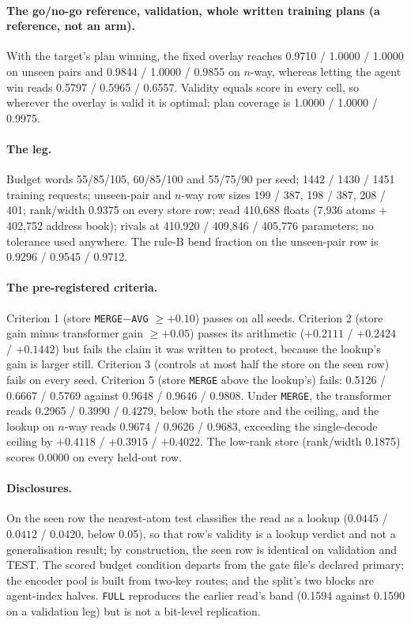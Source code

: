 \documentclass{article} %
\begin{document}
\paragraph{The go/no-go reference, validation, whole written training plans (a reference, not an
arm).} With the target's plan winning, the fixed overlay reaches 0.9710 / 1.0000 / 1.0000 on unseen
pairs and 0.9844 / 1.0000 / 0.9855 on $n$-way, whereas letting the agent win reads 0.5797 / 0.5965 /
0.6557. Validity equals score in every cell, so wherever the overlay is valid it is optimal; plan
coverage is 1.0000 / 1.0000 / 0.9975. %

\paragraph{The leg.} Budget words 55/85/105, 60/85/100 and 55/75/90 per seed; 1442 / 1430 / 1451
training requests; unseen-pair and $n$-way row sizes 199 / 387, 198 / 387, 208 / 401; rank/width
0.9375 on every store row; read 410,688 floats (7,936 atoms + 402,752 address book); rivals at
410,920 / 409,846 / 405,776 parameters; no tolerance used anywhere. The rule-B bend fraction on the
unseen-pair row is 0.9296 / 0.9545 / 0.9712. %

\paragraph{The pre-registered criteria.} Criterion 1 (store \texttt{MERGE}$-$\texttt{AVG} $\ge+0.10$) passes on all seeds.
Criterion 2 (store gain minus transformer gain $\ge+0.05$) passes its arithmetic ($+0.2111$ / $+0.2424$
/ $+0.1442$) but fails the claim it was written to protect, because the lookup's gain is larger
still. Criterion 3 (controls at most half the store on the seen row) fails on every seed. Criterion 5 (store
\texttt{MERGE} above the lookup's) fails: 0.5126 / 0.6667 / 0.5769 against 0.9648 / 0.9646 /
0.9808. Under \texttt{MERGE}, the transformer reads 0.2965 / 0.3990 / 0.4279, below both the store
and the ceiling, and the lookup on $n$-way reads 0.9674 / 0.9626 / 0.9683, exceeding the
single-decode ceiling by $+0.4118$ / $+0.3915$ / $+0.4022$. The low-rank store
(rank/width 0.1875) scores 0.0000 on every held-out row. %

\paragraph{Disclosures.} On the seen row the nearest-atom test classifies the read as a lookup
($0.0445$ / $0.0412$ / $0.0420$, below 0.05), so that row's validity is a lookup verdict and not a
generalisation result; by construction, the seen row is identical on validation and TEST. The
scored budget condition departs from the gate file's declared primary; the encoder pool is built
from two-key routes; and the split's two blocks are agent-index halves. \texttt{FULL} reproduces
the earlier read's band (0.1594 against 0.1590 on a validation leg) but is not a bit-level
replication. %
\end{document}
